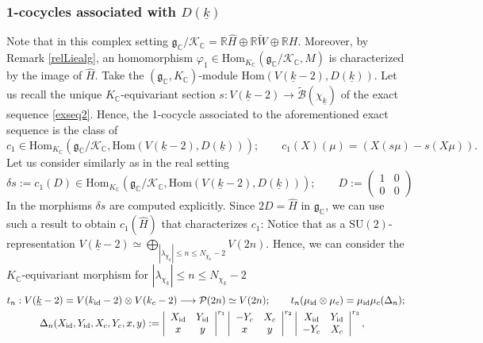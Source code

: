 \documentclass{amsart}
\theoremstyle{definition}
\theoremstyle{remark}
\numberwithin{equation}{section}
\newcommand{\SU}{{\mathrm{SU}}}
\newcommand{\C}{{\mathbb C}}
\newcommand{\R}{{\mathbb R}}
\newcommand{\cB}{{\mathcal B}}
\newcommand{\cK}{{\mathcal K}}
\newcommand{\cP}{{\mathcal P}}
\newcommand{\mfg}{{\mathfrak g}}
\newcommand{\Hom}{{\mathrm {Hom}}}
\begin{document}
\subsubsection{1-cocycles associated with $D(\underline{k})$} Note that in this complex setting $\mfg_\C/\cK_\C=\R \hat H\oplus\R\tilde W\oplus\R H$.
Moreover, by Remark \ref{relLiealg}, an homomorphism $\varphi_1\in \Hom_{K_\C}\left(\mfg_\C/\cK_\C,M\right)$ is characterized by the image of $\hat H$. 
    Take the $(\mfg_\C,K_\C)$-module $\Hom(V(\underline k-2),D({\underline k}))$. 
Let us recall the unique $K_\C$-equivariant section $s:V(\underline k-2)\rightarrow\tilde \cB(\chi_{\underline k})$ of the exact sequence \eqref{exseq2}. Hence, the 1-cocycle associated to the aforementioned exact sequence is the class of
\begin{equation}\label{defc1}
c_1\in \Hom_{K_\C}\left(\mfg_\C/\cK_\C,\Hom(V(\underline k-2),D({\underline k}))\right);\qquad c_1(X)(\mu)=\left(X(s\mu)-s(X\mu)\right).
\end{equation}
Let us consider similarly as in the real setting
\begin{equation}\label{secdefds}
\delta s:=c_1(D)\in\Hom_{K_\C}\left(\mfg_\C/\cK_\C,\Hom(V(\underline{k}-2),D(\underline{k}))\right);\qquad  D:=\left(\begin{array}{cc}
    1&0\\0&0
\end{array}\right)
\end{equation}
In \cite[Proposition 4.24]{preprintsanti2} the morphisms $\delta s$ are computed explicitly. Since $2D= \hat H$ in $\mfg_\C$,
we can use such a result to obtain $c_1(\hat H)$ that characterizes $c_1$: Notice that as a $\SU(2)$-representation $V(\underline{k}-2)\simeq \bigoplus_{|\lambda_{\chi_{\underline k}}|\leq n\leq N_{\chi_{\underline k}}-2}V(2n)$. Hence, we can consider the $K_\C$-equivariant morphism for $|\lambda_{\chi_{\underline k}}|\leq n\leq N_{\chi_{\underline k}}-2$
\begin{eqnarray*}
t_n:V(\underline{k}-2)=V(k_{\rm id}-2)\otimes V(k_c-2)\longrightarrow \cP(2n)\simeq V(2n);\qquad t_n(\mu_{\rm id}\otimes\mu_c)=\mu_{\rm id}\mu_c(\Delta_n);\\
\Delta_n(X_{\rm id},Y_{\rm id},X_{c},Y_{c},x,y):=\left|\begin{array}{cc}X_{\rm id}&Y_{\rm id}\\x&y\end{array}\right|^{r_1}\left|\begin{array}{cc}-Y_{c}&X_{c}\\x&y\end{array}\right|^{r_2}\left|\begin{array}{cc}X_{\rm id}&Y_{\rm id}\\-Y_c&X_c\end{array}\right|^{r_3},\qquad\qquad
\end{eqnarray*}
\end{document}
